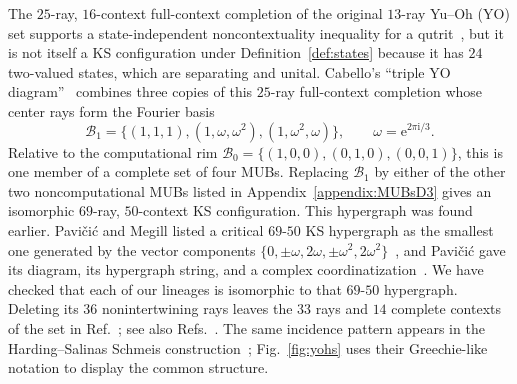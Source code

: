 \documentclass[%
  reprint,
  superscriptaddress,
  showkeys,
  amsmath,amssymb,
  aps,pra,
  longbibliography,
  floatfix,
  x11names
]{revtex4-2}
\newcommand{\ii}{\mathrm{i}}
\begin{document}
The $25$-ray, $16$-context full-context completion of the original $13$-ray Yu--Oh (YO) set supports a state-independent noncontextuality inequality for a qutrit~\cite{PhysRevLett.103.050401,Yu-2012,Yu2015}, but it is not itself a KS configuration under Definition~\ref{def:states} because it has $24$ two-valued states, which are separating and unital.  Cabello's ``triple YO diagram''~\cite{Cabello2025} combines three copies of this $25$-ray full-context completion whose center rays form the Fourier basis
\[
\mathcal{B}_1=\{(1,1,1),(1,\omega,\omega^2),(1,\omega^2,\omega)\},
\qquad \omega=\mathrm{e}^{2\pi\ii{}/3}.
\]
Relative to the computational rim $\mathcal{B}_0=\{(1,0,0),(0,1,0),(0,0,1)\}$, this is one member of a complete set of four MUBs.  Replacing $\mathcal{B}_1$ by either of the other two noncomputational MUBs listed in Appendix~\ref{appendix:MUBsD3} gives an isomorphic $69$-ray, $50$-context KS configuration.  This hypergraph was found earlier.  Pavi\v{c}i\'{c} and Megill listed a critical $69$-$50$ KS hypergraph as the smallest one generated by the vector components $\{0,\pm\omega,2\omega,\pm\omega^2,2\omega^2\}$~\cite[Table~I]{pavicic-megill-2022}, and Pavi\v{c}i\'{c} gave its diagram, its hypergraph string, and a complex coordinatization~\cite[Fig.~10(e), Table~2, and Appendix~C]{Pavicic_2023}.  We have checked that each of our lineages is isomorphic to that $69$-$50$ hypergraph.  Deleting its $36$ nonintertwining rays leaves the $33$ rays and $14$ complete contexts of the set in Ref.~\cite{Cabello2025}; see also Refs.~\cite{Pavicic-2025-simplest,Pavicic-2026-entropy}.  The same incidence pattern appears in the Harding--Salinas Schmeis construction~\cite[Fig.~2 and Theorem~2.6]{harding2025remarksIJTP}; Fig.~\ref{fig:yohs} uses their Greechie-like notation to display the common structure.
\end{document}
